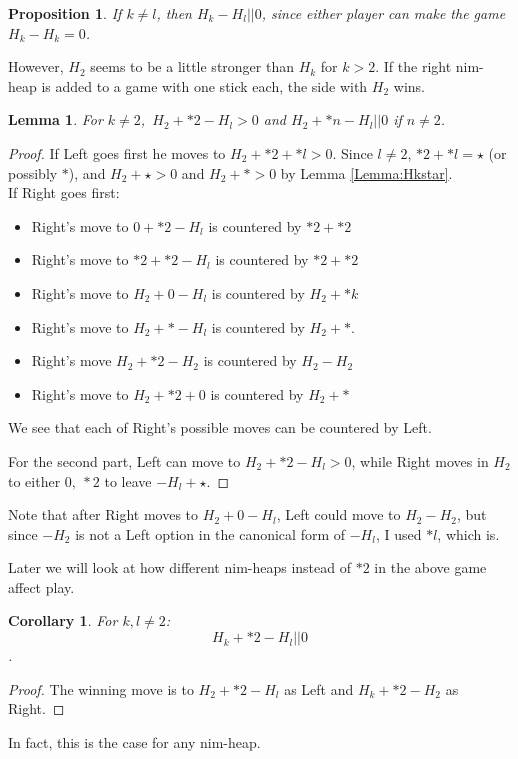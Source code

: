 \documentclass{amsart}
\newtheorem{corollary}[definition]{Corollary}
\newtheorem{proposition}[definition]{Proposition}
\newtheorem{lemma}[definition]{Lemma}
\begin{document}
\begin{proposition}
If $k\neq l$, then $H_k-H_l||0$, since either player can make the game $H_k-H_k=0$.
\end{proposition}

However, $H_2$ seems to be a little stronger than $H_k$ for $k>2$.  If the right nim-heap is added to a game with one stick each, the side with $H_2$ wins.


\begin{lemma}
\label{Lemma:*2H2}
For $k\neq 2$,\ $H_2+*2-H_l>0$ and $H_2+*n-H_l||0$ if $n\neq 2$.
\end{lemma}
\begin{proof}
If Left goes first he moves to $H_2+*2+*l>0$.  Since $l\neq 2$, $*2+*l=\star$ (or possibly $*$), and $H_2+\star>0$ and $H_2+*>0$ by Lemma \ref{Lemma:Hkstar}.\\
If Right goes first:
\begin{itemize}
\item Right's move to $0+*2-H_l$ is countered by $*2+*2$
\item Right's move to $*2+*2-H_l$ is countered by $*2+*2$
\item Right's move to $H_2+0-H_l$ is countered by $H_2+*k$
\item Right's move to $H_2+*-H_l$ is countered by $H_2+*$.
\item Right's move $H_2+*2-H_2$ is countered by $H_2-H_2$
\item Right's move to $H_2+*2+0$ is countered by $H_2+*$
\end{itemize}
We see that each of Right's possible moves can be countered by Left.
\par For the second part, Left can move to $H_2+*2-H_l>0$, while Right moves in $H_2$ to either $0,\ *2$ to leave $-H_l+\star$.
\end{proof}
Note that after Right moves to $H_2+0-H_l$, Left could move to  $H_2-H_2$, but since $-H_2$ is not a Left option in the canonical form of $-H_l$, I used $*l$, which is.
\par Later we will look at how different nim-heaps instead of $*2$ in the above game affect play.



\begin{corollary}
For $k,l\neq 2$:
$$H_k+*2-H_l||0$$.
\end{corollary}
\begin{proof}
The winning move is to $H_2+*2-H_l$ as Left and $H_k+*2-H_2$ as Right.
\end{proof}
In fact, this is the case for any nim-heap.
\end{document}
